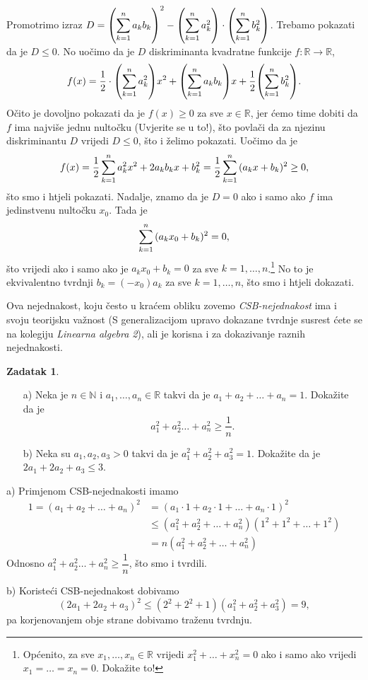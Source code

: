 \documentclass{book}
\let\originalleft\left
\let\originalright\right
\renewcommand{\left}{\mathopen{}\mathclose\bgroup\originalleft}
\renewcommand{\right}{\aftergroup\egroup\originalright}
\renewenvironment{proof}{%
    \vspace{-\parskip}\begin{oldproof}%
    }{%
    \end{oldproof}%
}
\theoremstyle{definition}
\theoremstyle{definition}
\newtheorem{exercise}{Zadatak}
\theoremstyle{remark}
\begin{document}
\begin{proof}[Rješenje]
Promotrimo izraz $D=\left(\dsum_{k=1}^n{\,a_kb_k}\right)^2- \left(\dsum_{k=1}^n{\,a_k^2}\right)\cdot\left(\dsum_{k=1}^n{\,b_k^2}\right)$. Trebamo pokazati da je $D\leq 0$. No uočimo da je $D$ diskriminanta kvadratne funkcije $f : \mathbb{R}\to \mathbb{R}$,
$$f(x)=\dfrac{1}{2}\cdot\left(\dsum_{k=1}^n{\,a_k^2}\right)x^2+\left(\dsum_{k=1}^n{\,a_kb_k}\right)x+\dfrac{1}{2}\left(\dsum_{k=1}^n{\,b_k^2}\right).$$
Očito je dovoljno pokazati da je $f(x)\geq 0$ za sve $x\in \mathbb{R}$, jer ćemo time dobiti da $f$ ima najviše jednu nultočku (Uvjerite se u to!), što povlači da za njezinu diskriminantu $D$ vrijedi $D\leq 0$, što i želimo pokazati. Uočimo da je
$$f(x)=\dfrac{1}{2}\,\dsum_{k=1}^n{\,a_k^2x^2+2a_kb_kx+b_k^2}=\dfrac{1}{2}\,\dsum_{k=1}^n{\,(a_kx+b_k)^2}\geq 0,$$
što smo i htjeli pokazati. Nadalje, znamo da je $D=0$ ako i samo ako $f$ ima jedinstvenu nultočku $x_0$. Tada je $$\dsum_{k=1}^n{\,(a_kx_0+b_k)^2}=0,$$ što vrijedi ako i samo ako je $a_kx_0+b_k=0$ za sve $k=1, \dots, n$.\footnote{Općenito, za sve $x_1, \dots, x_n\in \mathbb{R}$ vrijedi $x_1^2+\dots+x_n^2=0$ ako i samo ako vrijedi $x_1=\dots=x_n=0$. Dokažite to!} No to je ekvivalentno tvrdnji $b_k=(-x_0)a_k$ za sve $k=1, \dots, n$, što smo i htjeli dokazati.
\end{proof}
Ova nejednakost, koju često u kraćem obliku zovemo \textit{CSB-nejednakost} ima i svoju teorijsku važnost (S generalizacijom upravo dokazane tvrdnje susrest ćete se na kolegiju \textit{Linearna algebra 2}), ali je korisna i za dokazivanje raznih nejednakosti.
\begin{exercise} \textbf{}
\begin{itemize}
\item[a)] Neka je $n\in \mathbb{N}$ i $a_1, \dots, a_n\in \mathbb{R}$ takvi da je $a_1+a_2+\dots+ a_n=1$. Dokažite da je $$a_1^2+a_2^2\dots+a_n^2\geq \dfrac{1}{n}.$$
\item[b)] Neka su $a_1, a_2, a_3>0$ takvi da je $a_1^2+a_2^2+a_3^2=1$. Dokažite da je $2a_1+2a_2+a_3\leq 3$.
\end{itemize}
\end{exercise}
\begin{proof}[Rješenje]
a) Primjenom CSB-nejednakosti imamo
\begin{align*}
1=(a_1+a_2+\dots+a_n)^2&=(a_1\cdot1+a_2\cdot 1+\dots+a_n\cdot 1)^2\\
&\leq(a_1^2+a_2^2+\dots+a_n^2)(1^2+1^2+\dots+1^2)\\
&=n(a_1^2+a_2^2+\dots+a_n^2)
\end{align*}
Odnosno $a_1^2+a_2^2\dots+a_n^2\geq \dfrac{1}{n}$, što smo i tvrdili.

b) Koristeći CSB-nejednakost dobivamo
$$(2a_1+2a_2+a_3)^2\leq (2^2+2^2+1)(a_1^2+a_2^2+a_3^2)=9,$$
pa korjenovanjem obje strane dobivamo traženu tvrdnju.
\end{proof}
\end{document}
